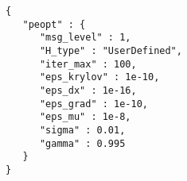 \begin{lstlisting}[style=json,caption={PEOpt uses this input specification to minimize the inequality constrained problem specified in Listing \ref{lst:simpleIneq}.  We explain this specification Chapter \ref{ch:Input}.},label=lst:simpleIneqJSON]
{
   "peopt" : {
      "msg_level" : 1,
      "H_type" : "UserDefined",
      "iter_max" : 100,
      "eps_krylov" : 1e-10,
      "eps_dx" : 1e-16,
      "eps_grad" : 1e-10,
      "eps_mu" : 1e-8,
      "sigma" : 0.01,
      "gamma" : 0.995
   }
}
\end{lstlisting}
